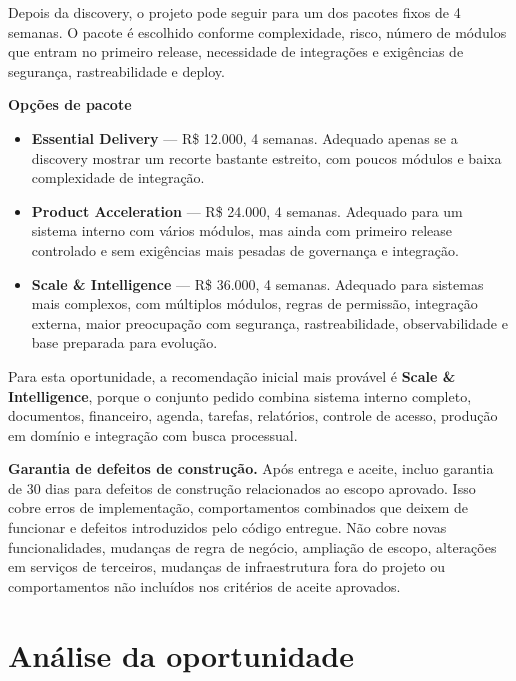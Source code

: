 \documentclass[11pt,a4paper]{article}
\begin{document}
Depois da discovery, o projeto pode seguir para um dos pacotes fixos de 4 semanas. O pacote é escolhido conforme complexidade, risco, número de módulos que entram no primeiro release, necessidade de integrações e exigências de segurança, rastreabilidade e deploy.\par

\textbf{Opções de pacote}\par

\begin{itemize}
\item \textbf{Essential Delivery} --- R\$ 12.000, 4 semanas. Adequado apenas se a discovery mostrar um recorte bastante estreito, com poucos módulos e baixa complexidade de integração.
\item \textbf{Product Acceleration} --- R\$ 24.000, 4 semanas. Adequado para um sistema interno com vários módulos, mas ainda com primeiro release controlado e sem exigências mais pesadas de governança e integração.
\item \textbf{Scale \& Intelligence} --- R\$ 36.000, 4 semanas. Adequado para sistemas mais complexos, com múltiplos módulos, regras de permissão, integração externa, maior preocupação com segurança, rastreabilidade, observabilidade e base preparada para evolução.
\end{itemize}

Para esta oportunidade, a recomendação inicial mais provável é \textbf{Scale \& Intelligence}, porque o conjunto pedido combina sistema interno completo, documentos, financeiro, agenda, tarefas, relatórios, controle de acesso, produção em domínio e integração com busca processual.\par

\textbf{Garantia de defeitos de construção.} Após entrega e aceite, incluo garantia de 30 dias para defeitos de construção relacionados ao escopo aprovado. Isso cobre erros de implementação, comportamentos combinados que deixem de funcionar e defeitos introduzidos pelo código entregue. Não cobre novas funcionalidades, mudanças de regra de negócio, ampliação de escopo, alterações em serviços de terceiros, mudanças de infraestrutura fora do projeto ou comportamentos não incluídos nos critérios de aceite aprovados.\par

\section*{Análise da oportunidade}
\end{document}
